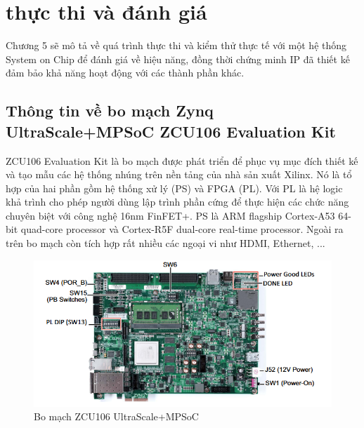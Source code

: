 \clearpage
{}

\setcounter{chapter}{4}

\chapter[{THỰC THI VÀ ĐÁNH GIÁ}]{thực thi và đánh giá}
Chương 5 sẽ mô tả về quá trình thực thi và kiểm thử thực tế với một hệ thống System on Chip để đánh giá về hiệu năng, đồng thời chứng minh IP đã thiết kế đảm bảo khả năng hoạt động với các thành phần khác.
\section{Thông tin về bo mạch Zynq UltraScale+MPSoC ZCU106 Evaluation Kit}
ZCU106 Evaluation Kit là bo mạch được phát triển để phục vụ mục đích thiết kế và tạo mẫu các hệ thống nhúng trên nền tảng của nhà sản xuất Xilinx. Nó là tổ hợp của hai phần gồm hệ thống xử lý (PS) và FPGA (PL). Với PL là hệ logic khả trình cho phép người dùng lập trình phần cứng để thực hiện các chức năng chuyên biệt với công nghệ 16nm FinFET+. PS là ARM flagship Cortex-A53 64-bit quad-core processor và Cortex-R5F dual-core real-time processor. Ngoài ra trên bo mạch còn tích hợp rất nhiều các ngoại vi như HDMI, Ethernet, ...
\begin{figure}[!ht]
	\centering
	\includegraphics[width=1\linewidth]{figures/zcu106.png}
	\caption{Bo mạch ZCU106 UltraScale+MPSoC}
	\label{fig:zcu106}
\end{figure}
